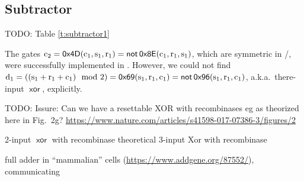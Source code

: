 \documentclass[12pt,notitlepage]{article}
\newcommand{\TODO}[1]{\textrm{\color{red}TODO: #1}}
\newcommand{\NOT}{\ensuremath{\mathop{\mathsf{not}}}\xspace}
\newcommand{\XOR}{\ensuremath{\mathop{\mathsf{xor}}}\xspace}
\newcommand{\ra}[1]{{\color{Blue}#1}}
\begin{document}
%





\subsection{Subtractor} \label{s:sub}

\TODO{Table \ref{t:subtractor1}}

The gates
$
	\ce{c_2} 
	=
	\mathop{\mathsf{0x4D}}
	(\ce{c_1}, \ce{s_1}, \ce{r_1}) 
	=
	\NOT
	\mathop{\mathsf{0x8E}}
	(\ce{c_1}, \ce{r_1}, \ce{s_1})
$,
which are
symmetric in /,
were successfully
implemented in \cite{NielsenETAL2016}.
%
%
However,
we could not find
$
	\ce{d_1} 
	= 
	((\ce{s_1} + \ce{r_1} + \ce{c_1}) \mod 2)
	=
	\mathop{\mathsf{0x69}}
	(\ce{s_1}, \ce{r_1}, \ce{c_1})
	=
	\NOT
	\mathop{\mathsf{0x96}}
	(\ce{s_1}, \ce{r_1}, \ce{c_1})
$,
a.k.a.~there-input \XOR,
explicitly.

%


\TODO{
\ra{Issure:} Can we have a resettable XOR with recombinases
eg as theorized here in Fig.~2g?
\url{https://www.nature.com/articles/s41598-017-07386-3/figures/2}
}


\ra{2-input \XOR with recombinase \cite{BonnetETAL2013}}
\ra{theoretical 3-input Xor with recombinase \cite{ChiuJiang2017}}

\ra{full adder in ``mammalian'' cells \cite{WeinbergETAL2017} (\url{https://www.addgene.org/87552/}),
communicating \cite{AuslaenderETAL2017}}

%





\end{document}
